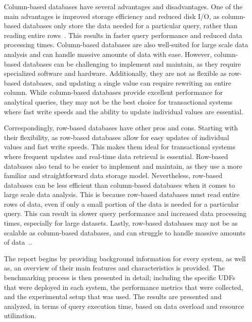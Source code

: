 Column-based databases have several advantages and disadvantages. 
One of the main advantages is improved storage efficiency and reduced disk I/O, 
as column-based databases only store the data needed for a particular query, 
rather than reading entire rows~\cite{BHSB14}. 
This results in faster query performance and reduced data processing times. 
Column-based databases are also well-suited for large scale data analysis and can handle massive amounts of data with ease. 
However, column-based databases can be challenging to implement and maintain, as they require specialized software and hardware. 
Additionally, they are not as flexible as row-based databases, and updating a single value can require rewriting an entire column. 
While column-based databases provide excellent performance for analytical queries, 
they may not be the best choice for transactional systems 
where fast write speeds and the ability to update individual values are essential.

Correspondingly, row-based databases have other pros and cons. 
Starting with their flexibility, as row-based databases allow for easy updates of individual values and fast write speeds.
This makes them ideal for transactional systems where frequent updates and real-time data retrieval is essential. 
Row-based databases also tend to be easier to implement and maintain, 
as they use a more familiar and straightforward data storage model. 
Nevertheless, row-based databases can be less efficient than column-based databases when it comes 
to large scale data analysis. 
This is because row-based databases must read entire rows of data, 
even if only a small portion of the data is needed for a particular query. 
This can result in slower query performance and increased data processing times, 
especially for large datasets. 
Lastly, row-based databases may not be as scalable as column-based databases, 
and can struggle to handle massive amounts of data~\cite{BHSB14}..


The report begins by providing background information 
for every system, as well as, an overview 
of their main features and characteristics is provided.
The benchmarking process is then presented in detail; 
including the specific UDFs that were deployed in each system, 
the performance metrics that were collected, 
and the experimental setup that was used. 
The results are presented and analyzed, 
in terms of query execution time, 
based on data overload and resource utilization. 

